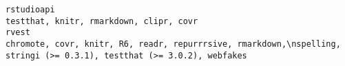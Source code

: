 \documentclass[
  letterpaper,
  DIV=11,
  numbers=noendperiod]{scrreprt}
\begin{document}
\begin{verbatim}
rstudioapi                                                                                                                                                                                                                                                                                                                                                                                                                                                                                                                                                                                                                                                                                                                                                                                                                                                                                                                                                                                                                                                                                                                                                                                                                                                            testthat, knitr, rmarkdown, clipr, covr
rvest                                                                                                                                                                                                                                                                                                                                                                                                                                                                                                                                                                                                                                                                                                                                                                                                                                                                                                                                                                                                                                                                                                                                                                                  chromote, covr, knitr, R6, readr, repurrrsive, rmarkdown,\nspelling, stringi (>= 0.3.1), testthat (>= 3.0.2), webfakes

\end{verbatim}
\end{document}
